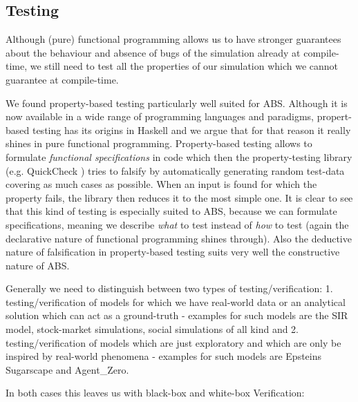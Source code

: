 \subsection{Testing}
Although (pure) functional programming allows us to have stronger guarantees about the behaviour and absence of bugs of the simulation already at compile-time, we still need to test all the properties of our simulation which we cannot guarantee at compile-time.

We found property-based testing particularly well suited for ABS. Although it is now available in a wide range of programming languages and paradigms, propert-based testing has its origins in Haskell \cite{claessen_quickcheck:_2000, claessen_testing_2002} and we argue that for that reason it really shines in pure functional programming. Property-based testing allows to formulate \textit{functional specifications} in code which then the property-testing library (e.g. QuickCheck \cite{claessen_quickcheck:_2000}) tries to falsify by automatically generating random test-data covering as much cases as possible. When an input is found for which the property fails, the library then reduces it to the most simple one. It is clear to see that this kind of testing is especially suited to ABS, because we can formulate specifications, meaning we describe \textit{what} to test instead of \textit{how} to test (again the declarative nature of functional programming shines through). Also the deductive nature of falsification in property-based testing suits very well the constructive nature of ABS.

Generally we need to distinguish between two types of testing/verification: 1. testing/verification of models for which we have real-world data or an analytical solution which can act as a ground-truth - examples for such models are the SIR model, stock-market simulations, social simulations of all kind and 2. testing/verification of models which are just exploratory and which are only be inspired by real-world phenomena - examples for such models are Epsteins Sugarscape and Agent\_Zero.

In both cases this leaves us with black-box and white-box Verification:

%

